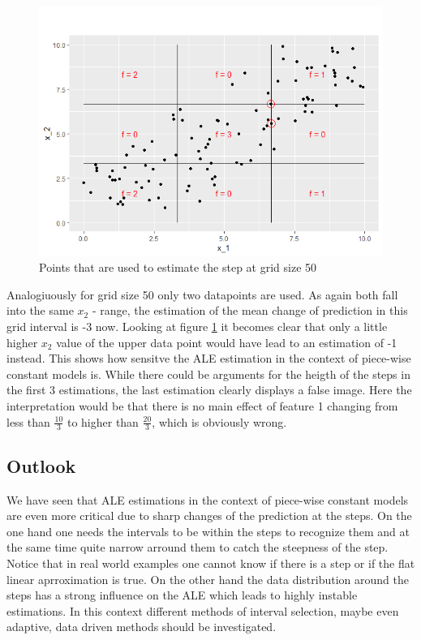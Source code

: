 \documentclass[
]{krantz}
\begin{document}
\begin{figure}
\includegraphics[width=1\linewidth]{images/ALE_2_pwc_example5_critical_points_} \caption{Points that are used to estimate the step at grid size 50}\label{fig:ALE2pwcexample5criticalpoints}
\end{figure}



Analogiuously for grid size 50 only two datapoints are used. As again both fall into the same \(x_2\) - range, the estimation of the mean change of prediction in this grid interval is -3 now. Looking at figure \ref{fig:ALE2pwcexample5criticalpoints} it becomes clear that only a little higher \(x_2\) value of the upper data point would have lead to an estimation of -1 instead. This shows how sensitve the ALE estimation in the context of piece-wise constant models is. While there could be arguments for the heigth of the steps in the first 3 estimations, the last estimation clearly displays a false image. Here the interpretation would be that there is no main effect of feature 1 changing from less than \(\frac{10}{3}\) to higher than \(\frac{20}{3}\), which is obviously wrong.

\hypertarget{outlook}{%
\subsection{Outlook}\label{outlook}}

We have seen that ALE estimations in the context of piece-wise constant models are even more critical due to sharp changes of the prediction at the steps. On the one hand one needs the intervals to be within the steps to recognize them and at the same time quite narrow arround them to catch the steepness of the step. Notice that in real world examples one cannot know if there is a step or if the flat linear aprroximation is true. On the other hand the data distribution around the steps has a strong influence on the ALE which leads to highly instable estimations. In this context different methods of interval selection, maybe even adaptive, data driven methods should be investigated.
\end{document}
